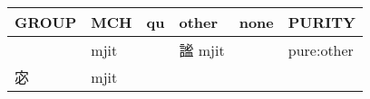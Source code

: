 \documentclass[14pt,a4paper]{scrartcl}
\begin{document}
\begin{longtable}[c]{@{}llllll@{}}
\toprule
\begin{minipage}[b]{0.14\columnwidth}\raggedright\strut
GROUP
\strut\end{minipage} &
\begin{minipage}[b]{0.14\columnwidth}\raggedright\strut
MCH
\strut\end{minipage} &
\begin{minipage}[b]{0.14\columnwidth}\raggedright\strut
qu
\strut\end{minipage} &
\begin{minipage}[b]{0.14\columnwidth}\raggedright\strut
other
\strut\end{minipage} &
\begin{minipage}[b]{0.14\columnwidth}\raggedright\strut
none
\strut\end{minipage} &
\begin{minipage}[b]{0.14\columnwidth}\raggedright\strut
PURITY
\strut\end{minipage}\tabularnewline
\midrule
\endhead
\begin{minipage}[t]{0.14\columnwidth}\raggedright\strut
𥁑
\strut\end{minipage} &
\begin{minipage}[t]{0.14\columnwidth}\raggedright\strut
mjit
\strut\end{minipage} &
\begin{minipage}[t]{0.14\columnwidth}\raggedright\strut
\strut\end{minipage} &
\begin{minipage}[t]{0.14\columnwidth}\raggedright\strut
謐 mjit
\strut\end{minipage} &
\begin{minipage}[t]{0.14\columnwidth}\raggedright\strut
\strut\end{minipage} &
\begin{minipage}[t]{0.14\columnwidth}\raggedright\strut
pure:other
\strut\end{minipage}\tabularnewline
\begin{minipage}[t]{0.14\columnwidth}\raggedright\strut
宓
\strut\end{minipage} &
\begin{minipage}[t]{0.14\columnwidth}\raggedright\strut
mjit
\strut\end{minipage} &
\begin{minipage}[t]{0.14\columnwidth}\raggedright\strut
\strut\end{minipage} &
\begin{minipage}[t]{0.14\columnwidth}\raggedright\strut

\end{minipage}
\end{longtable}
\end{document}
